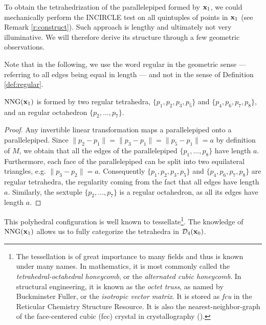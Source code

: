 To obtain the tetrahedrization of the parallelepiped formed by ${\mathbf{x}}_1$, we could mechanically perform the INCIRCLE test on all quintuples of points in ${\mathbf{x}}_1$ (see Remark \ref{r:construct}). Such approach is lengthy and ultimately not very illuminative. We will therefore derive its structure through a few geometric observations.

Note that in the following, we use the word regular in the geometric sense --- referring to all edges being equal in length --- and not in the sense of Definition \ref{def:regular}.
\begin{lemma}
	$\mathrm{NNG}({\mathbf{x}}_1)$ is formed by two regular tetrahedra, $\{p_1,p_2,p_3,p_5\}$ and $\{p_4,p_6,p_7,p_8\}$, and an regular octahedron $\{p_2,\dots,p_7\}$.
\end{lemma}
\begin{proof}
	Any invertible linear transformation maps a parallelepiped onto a parallelepiped. Since $\|p_2 - p_1\| = \|p_3-p_1\| = \|p_5-p_1\|=a$ by definition of $M$, we obtain that all the edges of the parallelepiped $\{p_1,\dots,p_8\}$ have length $a$. Furthermore, each face of the parallelepiped can be split into two equilateral triangles, e.g. $\|p_3-p_2\|=a$. Consequently $\{p_1,p_2,p_3,p_5\}$ and $\{p_4,p_6,p_7,p_8\}$ are regular tetrahedra, the regularity coming from the fact that all edges have length $a$. Similarly, the sextuple $\{p_2,\dots,p_7\}$ is a regular octahedron, as all its edges have length $a$.
\end{proof}

This polyhedral configuration is well known to tessellate\footnote{ The tessellation is of great importance to many fields and thus is known under many names. In mathematics, it is most commonly called the \textit{tetrahedral-octahedral honeycomb}, or the \textit{alternated cubic honeycomb}. In structural engineering, it is known as the \textit{octet truss}, as named by Buckminster Fuller, or the \textit{isotropic vector matrix}. It is stored as \textit{fcu} in the Reticular Chemistry Structure Resource\cite{RCSR}. It is also the nearest-neighbor-graph of the face-centered cubic (fcc) crystal in crystallography (\cite{Gabbrielli12}).  }. The knowledge of $\mathrm{NNG}({\mathbf{x}}_1)$ allows us to fully categorize the tetrahedra in $\mathcal D_4({\mathbf{x}}_0)$.

